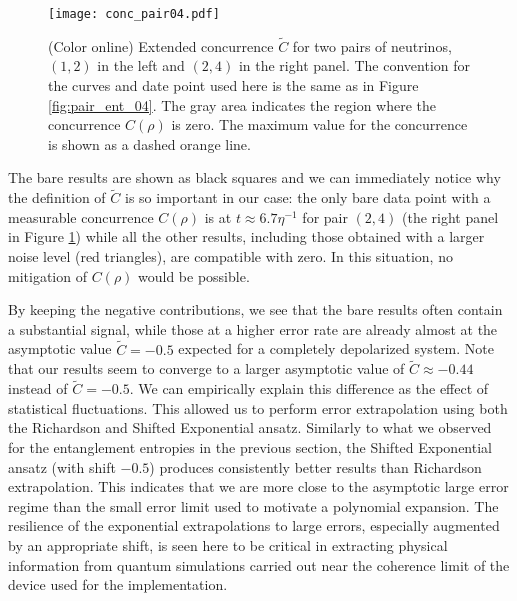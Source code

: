 \documentclass[Dual]{msu-thesis}
\begin{document}
\begin{figure}[tbh]
 \centering
 \texttt{[image: conc\_pair04.pdf]}
 \caption{(Color online) Extended concurrence $\widetilde{C}$ for two pairs of neutrinos, $(1,2)$ in the left and $(2,4)$ in the right panel. The convention for the curves and date point used here is the same as in Figure \ref{fig:pair_ent_04}. The gray area indicates the region where the concurrence $C(\rho)$ is zero. The maximum value for the concurrence is shown as a dashed orange line.}
\label{fig:conc_pair_04}
\end{figure}


The bare results are shown as black squares and we can immediately notice why the definition of $\widetilde{C}$ is so important in our case: the only bare data point with a measurable concurrence $C(\rho)$ is at $t\approx6.7\eta^{-1}$ for pair $(2,4)$ (the right panel in Figure \ref{fig:conc_pair_04}) while all the other results, including those obtained with a larger noise level (red triangles), are compatible with zero. In this situation, no mitigation of $C(\rho)$ would be possible.

By keeping the negative contributions, we see that the bare results often contain a substantial signal, while those at a higher error rate are already almost at the asymptotic value $\widetilde{C}=-0.5$ expected for a completely depolarized system. Note that our results seem to converge to a larger asymptotic value of $\widetilde{C}\approx-0.44$ instead of $\widetilde{C}=-0.5$. We can empirically explain this difference as the effect of statistical fluctuations. This allowed us to perform error extrapolation using both the Richardson and Shifted Exponential ansatz. Similarly to what we observed for the entanglement entropies in the previous section, the Shifted Exponential ansatz (with shift $-0.5$) produces consistently better results than Richardson extrapolation. This indicates that we are more close to the asymptotic large error regime than the small error limit used to motivate a polynomial expansion. The resilience of the exponential extrapolations to large errors, especially augmented by an appropriate shift, is seen here to be critical in extracting physical information from quantum simulations carried out near the coherence limit of the device used for the implementation.    

\end{document}
